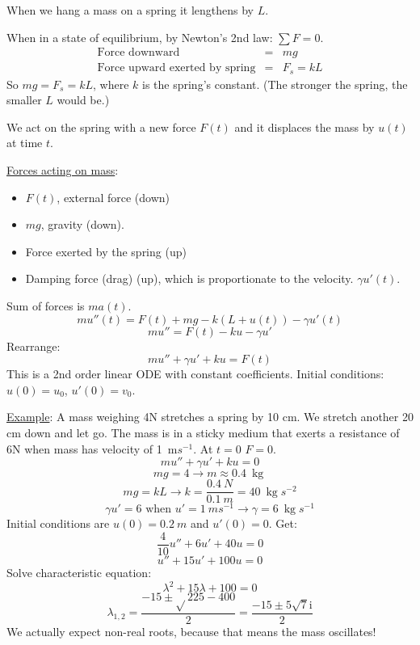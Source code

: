 \documentclass{article}
\newcommand{\mathi}{\mathrm{i}}
\newcommand{\tmop}[1]{\ensuremath{\operatorname{#1}}}
\begin{document}
When we hang a mass on a spring it lengthens by $L$.

When in a state of equilibrium, by Newton's 2nd law: $\sum F = 0$.
\begin{eqnarray*}
  \text{Force downward} & = & mg\\
  \text{Force upward exerted by spring} & = & F_s = kL
\end{eqnarray*}
So $mg = F_s = kL$, where $k$ is the spring's constant. (The stronger the
spring, the smaller $L$ would be.)

We act on the spring with a new force $F (t)$ and it displaces the mass by $u
(t)$ at time $t$.

\begin{center}
\end{center}

{\underline{Forces acting on mass}}:
\begin{itemize}
  \item $F (t)$, external force (down)
  
  \item $mg$, gravity (down).
  
  \item Force exerted by the spring (up)
  
  \item Damping force (drag) (up), which is proportionate to the velocity.
  $\gamma u' (t)$.
\end{itemize}
Sum of forces is $ma (t)$.
\[ mu'' (t) = F (t) + mg - k (L + u (t)) - \gamma u' (t) \]
\[ mu'' = F (t) - ku - \gamma u' \]
Rearrange:
\[ mu'' + \gamma u' + ku = F (t) \]
This is a 2nd order linear ODE with constant coefficients. Initial conditions:
${u (0) = u_0}$, $u' (0) = v_0$.

{\underline{Example}}: A mass weighing 4N stretches a spring by 10 cm. We
stretch another 20 cm down and let go. The mass is in a sticky medium that
exerts a resistance of 6N when mass has velocity of {\SI{1}{m}{$s^{- 1}$}}. At
$t = 0$ $F = 0$.
\[ mu'' + \gamma u' + ku = 0 \]
\[ mg = 4 \rightarrow m \approx \SI{0.4}{\tmop{kg}} \]
\[ mg = kL \rightarrow k = \frac{\SI{0.4}{N}}{\SI{0.1}{m}} =
   \SI{40}{\tmop{kg}}{s^{- 2}} \]
\[ \gamma u' = 6 \text{ when } u' = \SI{1}{m}{s^{- 1}} \rightarrow \gamma =
   \SI{6}{\tmop{kg}}{s^{- 1}} \]
Initial conditions are $u (0) = \SI{0.2}{m}$ and $u' (0) = 0$. Get:
\[ \frac{4}{10} u'' + 6 u' + 40 u = 0 \]
\[ u'' + 15 u' + 100 u = 0 \]
Solve characteristic equation:
\[ \lambda^2 + 15 \lambda + 100 = 0 \]
\[ \lambda_{1, 2} = \frac{- 15 \pm \sqrt{} 225 - 400}{2} = \frac{- 15 \pm 5
   \sqrt{7} \mathi}{2} \]
We actually expect non-real roots, because that means the mass oscillates!
\end{document}
